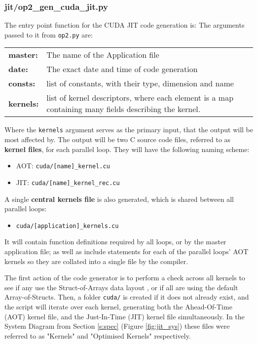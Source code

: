 \subsubsection{jit/op2\_gen\_cuda\_jit.py}
The entry point function for the CUDA JIT code generation is:
\noindent The arguments passed to it from \verb|op2.py| are:
\begin{center}
\begin{tabular}{>{\bfseries}l l}
master: & The name of the Application file \\[\medskipamount]
date: & The exact date and time of code generation \\[\medskipamount]
consts: & list of constants, with their type, dimension and name \\[\medskipamount]
kernels: & \parbox[t]{.8\textwidth}{list of kernel descriptors, where each element is a map containing many fields describing the kernel.} \\[\medskipamount]
\end{tabular}
\end{center}
\vspace{1em}
\noindent Where the \verb|kernels| argument serves as the primary input, that the output will be most affected by. The output will be two C source code files, referred to as \textbf{kernel files}, for each parallel loop. They will have the following naming scheme:
\begin{itemize}
\vspace{-.5em}
\item{AOT: \verb|cuda/[name]_kernel.cu|}
\vspace{-.5em}
\item{JIT: \verb|cuda/[name]_kernel_rec.cu|}
\end{itemize}
A single \textbf{central kernels file} is also generated, which is shared between all parallel loops:
\begin{itemize}
\vspace{-.5em}
\item{\verb|cuda/[application]_kernels.cu|}
\end{itemize}
It will contain function definitions required by all loops, or by the master application file; as well as include statements for each of the parallel loops' AOT kernels so they are collated into a single file by the compiler.
\par
The first action of the code generator is to perform a check across all kernels to see if any use the Struct-of-Arrays data layout \cite[p13]{manual}, or if all are using the default Array-of-Structs. Then, a folder \verb|cuda/| is created if it does not already exist, and the script will iterate over each kernel, generating both the Ahead-Of-Time (AOT) kernel file, and the Just-In-Time (JIT) kernel file simultaneously. In the System Diagram from Section \ref{s:spec} (Figure \ref{fig:jit_sys}) these files were referred to as "Kernels" and "Optimised Kernels" respectively.

